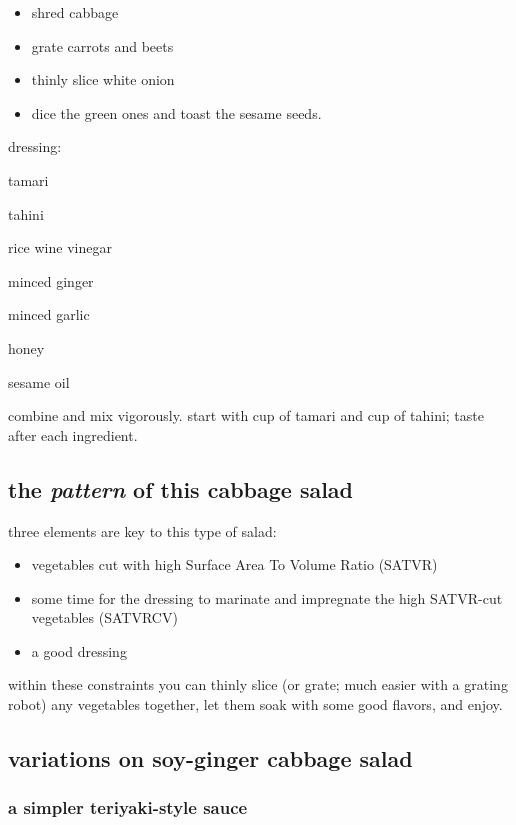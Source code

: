 \begin{itemize}
  \item shred cabbage
  \item grate carrots and beets
  \item thinly slice white onion
  \item dice the green ones and toast the sesame seeds.
\end{itemize}
	
dressing:
\begin{ingredients}
  \item tamari
  \item tahini
  \item rice wine vinegar
  \item minced ginger
  \item minced garlic
  \item honey
  \item sesame oil
\end{ingredients}

combine and mix vigorously. start with \onethird cup of tamari and \onequarter 
cup of tahini; taste after each ingredient.

\subsection{the \textit{pattern} of this cabbage salad}

three elements are key to this type of salad:

\begin{itemize}
  \item vegetables cut with high Surface Area To Volume Ratio (SATVR)
  \item some time for the dressing to marinate and impregnate the high 
  SATVR-cut vegetables (SATVRCV)
  \item a good dressing
\end{itemize}

within these constraints you can thinly slice (or grate; much easier with a 
grating robot) any vegetables together, let them soak with some good flavors, 
and enjoy.

\subsection{variations on soy-ginger cabbage salad}

\subsubsection{a simpler teriyaki-style sauce}

